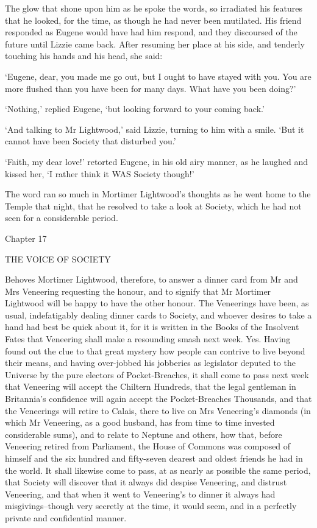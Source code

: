 The glow that shone upon him as he spoke the words, so irradiated his
features that he looked, for the time, as though he had never been
mutilated. His friend responded as Eugene would have had him respond,
and they discoursed of the future until Lizzie came back. After resuming
her place at his side, and tenderly touching his hands and his head, she
said:

‘Eugene, dear, you made me go out, but I ought to have stayed with you.
You are more flushed than you have been for many days. What have you
been doing?’

‘Nothing,’ replied Eugene, ‘but looking forward to your coming back.’

‘And talking to Mr Lightwood,’ said Lizzie, turning to him with a smile.
‘But it cannot have been Society that disturbed you.’

‘Faith, my dear love!’ retorted Eugene, in his old airy manner, as he
laughed and kissed her, ‘I rather think it WAS Society though!’

The word ran so much in Mortimer Lightwood’s thoughts as he went home to
the Temple that night, that he resolved to take a look at Society, which
he had not seen for a considerable period.



Chapter 17

THE VOICE OF SOCIETY


Behoves Mortimer Lightwood, therefore, to answer a dinner card from Mr
and Mrs Veneering requesting the honour, and to signify that Mr Mortimer
Lightwood will be happy to have the other honour. The Veneerings have
been, as usual, indefatigably dealing dinner cards to Society, and
whoever desires to take a hand had best be quick about it, for it is
written in the Books of the Insolvent Fates that Veneering shall make a
resounding smash next week. Yes. Having found out the clue to that great
mystery how people can contrive to live beyond their means, and having
over-jobbed his jobberies as legislator deputed to the Universe by the
pure electors of Pocket-Breaches, it shall come to pass next week that
Veneering will accept the Chiltern Hundreds, that the legal gentleman in
Britannia’s confidence will again accept the Pocket-Breaches Thousands,
and that the Veneerings will retire to Calais, there to live on Mrs
Veneering’s diamonds (in which Mr Veneering, as a good husband, has from
time to time invested considerable sums), and to relate to Neptune and
others, how that, before Veneering retired from Parliament, the House
of Commons was composed of himself and the six hundred and fifty-seven
dearest and oldest friends he had in the world. It shall likewise come
to pass, at as nearly as possible the same period, that Society will
discover that it always did despise Veneering, and distrust Veneering,
and that when it went to Veneering’s to dinner it always had
misgivings--though very secretly at the time, it would seem, and in a
perfectly private and confidential manner.

